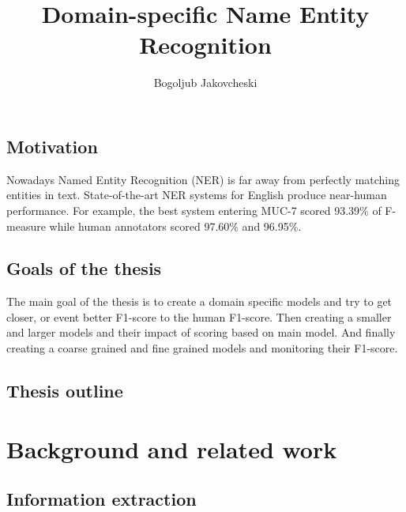 \documentclass[thesis=M,english]{FITthesis}[2018/05/30]
\title{Domain-specific Name Entity Recognition}
\author{Bogoljub Jakovcheski} %
\begin{document}

\begin{introduction}

\section{Motivation}
	Nowadays Named Entity Recognition (NER) is far away from perfectly matching entities in text. State-of-the-art NER systems for English produce near-human performance. For example, the best system entering MUC-7 scored 93.39\% of F-measure while human annotators scored 97.60\% and 96.95\%. %
	  
\section{Goals of the thesis}	
	
	The main goal of the thesis is to create a domain specific models and try to get closer, or event better F1-score to the human F1-score. Then creating a smaller and larger models and their impact of scoring based on main model. And finally creating a coarse grained and fine grained models and monitoring their F1-score.   
	
\section{Thesis outline}
	

\end{introduction}

\chapter{Background and related work}\label{}

	

\section{Information extraction}
\end{document}
